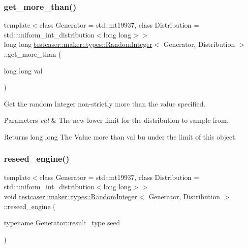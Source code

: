 \subsubsection{\texorpdfstring{get\+\_\+more\+\_\+than()}{get\_more\_than()}}
{\footnotesize\ttfamily template$<$class Generator = std\+::mt19937, class Distribution = std\+::uniform\+\_\+int\+\_\+distribution$<$long long$>$$>$ \\
long long \hyperlink{classtestcaser_1_1maker_1_1types_1_1RandomInteger}{testcaser\+::maker\+::types\+::\+Random\+Integer}$<$ Generator, Distribution $>$\+::get\+\_\+more\+\_\+than (\begin{DoxyParamCaption}\item[{long long}]{val }\end{DoxyParamCaption})\hspace{0.3cm}{\ttfamily [inline]}}



Get the random Integer non-\/strictly more than the value specified. 


\begin{DoxyParams}{Parameters}
{\em val} & The new lower limit for the distribution to sample from. \\
\hline
\end{DoxyParams}
\begin{DoxyReturn}{Returns}
long long The Value more than val bu under the limit of this object. 
\end{DoxyReturn}
\mbox{\label{classtestcaser_1_1maker_1_1types_1_1RandomInteger_a86d3dace9ceb412e5337da90818da7b6}} 
\subsubsection{\texorpdfstring{reseed\+\_\+engine()}{reseed\_engine()}}
{\footnotesize\ttfamily template$<$class Generator = std\+::mt19937, class Distribution = std\+::uniform\+\_\+int\+\_\+distribution$<$long long$>$$>$ \\
void \hyperlink{classtestcaser_1_1maker_1_1types_1_1RandomInteger}{testcaser\+::maker\+::types\+::\+Random\+Integer}$<$ Generator, Distribution $>$\+::reseed\+\_\+engine (\begin{DoxyParamCaption}\item[{typename Generator\+::result\+\_\+type}]{seed }\end{DoxyParamCaption})\hspace{0.3cm}{\ttfamily [inline]}}




